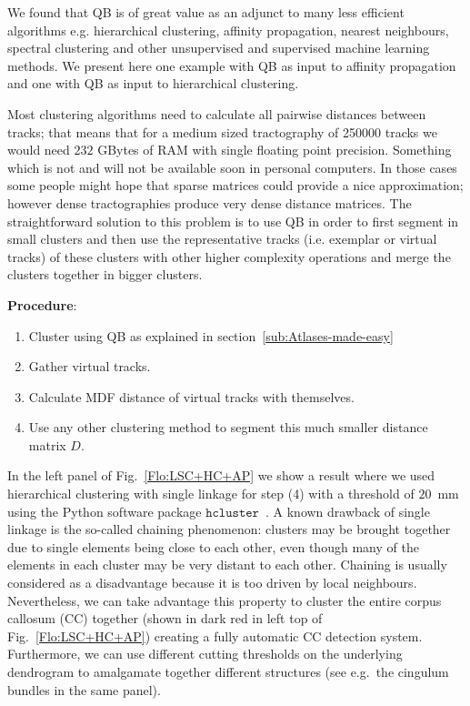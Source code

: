 \documentclass[preprint,authoryear,a4paper,10pt,onecolumn]{elsarticle}
\begin{document}
We found that QB is of great value as an adjunct to many less efficient
algorithms e.g. hierarchical clustering, affinity propagation, nearest
neighbours, spectral clustering and other unsupervised and supervised
machine learning methods. We present here one example with QB as input to
affinity propagation and one with QB as input to hierarchical
clustering.

Most clustering algorithms need to calculate all pairwise distances
between tracks; that means that for a medium sized tractography of
\num{250000} tracks we would need $232$ GBytes of RAM with single floating
point precision. Something which is not and will not be available soon
in personal computers. In those cases some people might hope that sparse
matrices could provide a nice approximation; however dense
tractographies produce very dense distance matrices. The straightforward
solution to this problem is to use QB in order to first segment in small
clusters and then use the representative tracks (i.e. exemplar or virtual
tracks) of these clusters with other higher complexity operations and merge the
clusters together in bigger clusters.

\textbf{Procedure}:

\begin{enumerate}

\item Cluster using QB as explained in section~\ref{sub:Atlases-made-easy}

\item Gather virtual tracks.

\item Calculate MDF distance of virtual tracks with themselves.

\item Use any other clustering method to segment this much smaller distance
matrix $D$.

\end{enumerate}

In the left panel of Fig.~\ref{Flo:LSC+HC+AP} we show a result where we
used hierarchical clustering with single linkage for step (4) with a
threshold of $20$~mm using the Python software package
$\texttt{hcluster}$~\citep{eads-hcluster-software}. A known drawback of
single linkage is the so-called chaining phenomenon: clusters may be
brought together due to single elements being close to each other, even
though many of the elements in each cluster may be very distant to each
other. Chaining is usually considered as a disadvantage because it is
too driven by local neighbours. Nevertheless, we can take advantage this
property to cluster the entire corpus callosum (CC) together (shown in
dark red in left top of Fig.~\ref{Flo:LSC+HC+AP}) creating a fully
automatic CC detection system.  Furthermore, we can use different
cutting thresholds on the underlying dendrogram to amalgamate together
different structures (see e.g.~the cingulum bundles in the same panel).
\end{document}
